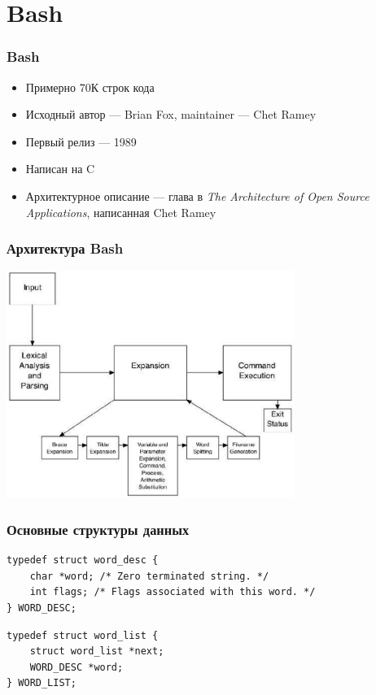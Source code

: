 \documentclass[xetex,mathserif,serif]{beamer}
\begin{document}
	\section{Bash}

	\begin{frame}
		\frametitle{Bash}
		\begin{itemize}
			\item Примерно 70К строк кода
			\item Исходный автор --- Brian Fox, maintainer --- Chet Ramey
			\item Первый релиз --- 1989
			\item Написан на C
			\item Архитектурное описание --- глава в \textit{The Architecture of Open Source Applications}, написанная Chet Ramey
		\end{itemize}
	\end{frame}

	\begin{frame}
		\frametitle{Архитектура Bash}
		\begin{center}
			\includegraphics[width=0.7\textwidth]{bashArchitecture.png}
		\end{center}
	\end{frame}

	\begin{frame}[fragile]
		\frametitle{Основные структуры данных}
		\begin{verbatim}
typedef struct word_desc {
    char *word; /* Zero terminated string. */
    int flags; /* Flags associated with this word. */
} WORD_DESC;
		\end{verbatim}

		\vspace{3mm}

		\begin{verbatim}
typedef struct word_list {
    struct word_list *next;
    WORD_DESC *word;
} WORD_LIST;
		\end{verbatim}
	\end{frame}
\end{document}

